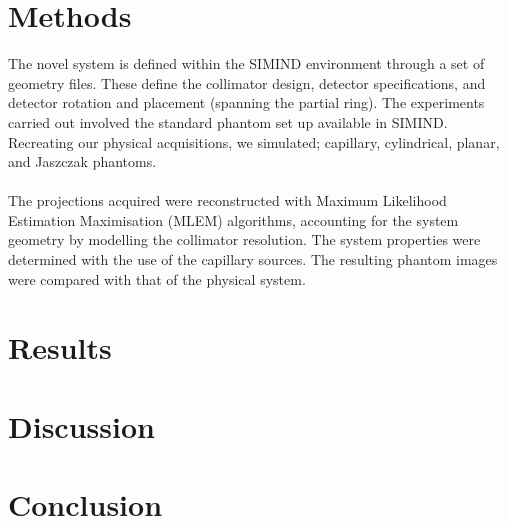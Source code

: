 \section{Methods}
The novel system is defined within the SIMIND environment through a set of geometry files. These define the collimator design, detector specifications, and detector rotation and placement (spanning the partial ring). The experiments carried out involved the standard phantom set up available in SIMIND. Recreating our physical acquisitions, we simulated; capillary, cylindrical, planar, and Jaszczak phantoms. 
\paragraph{}
The projections acquired were reconstructed with Maximum Likelihood Estimation Maximisation (MLEM) algorithms, accounting for the system geometry by modelling the collimator resolution. The system properties were determined with the use of the capillary sources. The resulting phantom images were compared with that of the physical system.  

\section{Results}

\section{Discussion}

\section{Conclusion}